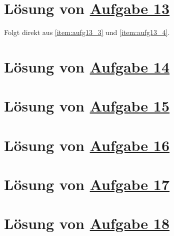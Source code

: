 \section{Lösung von 
	\texorpdfstring{\hyperref[aufg:13]{Aufgabe 13}}{}
}\label{loes:13}





Folgt direkt aus \ref{item:aufg13_3} und \ref{item:aufg13_4}.

\section{Lösung von 
	\texorpdfstring{\hyperref[aufg:14]{Aufgabe 14}}{}
}\label{loes:14}

\section{Lösung von 
	\texorpdfstring{\hyperref[aufg:15]{Aufgabe 15}}{}
}\label{loes:15}

\section{Lösung von 
	\texorpdfstring{\hyperref[aufg:16]{Aufgabe 16}}{}
}\label{loes:16}

\section{Lösung von 
	\texorpdfstring{\hyperref[aufg:17]{Aufgabe 17}}{}
}\label{loes:17}

\section{Lösung von 
	\texorpdfstring{\hyperref[aufg:18]{Aufgabe 18}}{}
}\label{loes:18}
